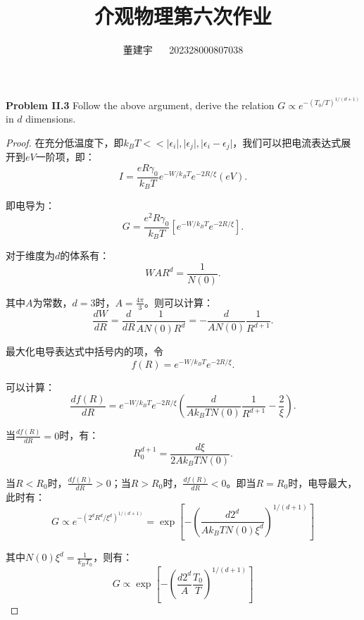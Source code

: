 \documentclass[reqno,a4paper,12pt]{amsart}
\title{介观物理第六次作业}
\author{董建宇 ~~ 202328000807038}
\begin{document}
\maketitle
\titleformat{\section}[hang]{\small}{\thesection}{0.8em}{}{}
\titleformat{\subsection}[hang]{\small}{\thesubsection}{0.8em}{}{}


\textbf{Problem II.3} Follow the above argument, derive the relation $G \propto e^{-(T_0/T)^{1/(d+1)}}$ in $d$ dimensions.

\begin{proof}

在充分低温度下，即$k_BT << \vert \epsilon_i \vert, \vert \epsilon_j \vert, \vert \epsilon_i - \epsilon_j \vert$，我们可以把电流表达式展开到$eV$一阶项，即：
\[
	I = \frac{eR\gamma_0}{k_BT} e^{-W/k_BT} e^{-2R/\xi} (eV).
\]

即电导为：
\[
	G = \frac{e^2R\gamma_0}{k_BT} \left[ e^{-W/k_BT} e^{-2R/\xi} \right].
\]

对于维度为$d$的体系有：
\[
	WAR^d = \frac{1}{N(0)}.
\]

其中$A$为常数，$d=3$时，$A = \frac{4\pi}{3}$。则可以计算：
\[
	\frac{dW}{dR} = \frac{d}{dR} \frac{1}{AN(0)R^d} = -\frac{d}{AN(0)}\frac{1}{R^{d+1}}.
\]

最大化电导表达式中括号内的项，令
\[
	f(R) = e^{-W/k_BT} e^{-2R/\xi}.
\]

可以计算：
\[
	\frac{df(R)}{dR} = e^{-W/k_BT} e^{-2R/\xi} \left( \frac{d}{Ak_BTN(0)} \frac{1}{R^{d+1}} - \frac{2}{\xi} \right).
\]

当$\frac{df(R)}{dR} = 0$时，有：
\[
	R_0^{d+1} = \frac{d\xi}{2Ak_BTN(0)}.
\]

当$R< R_0$时，$\frac{df(R)}{dR}>0$；当$R>R_0$时，$\frac{df(R)}{dR}<0$。即当$R = R_0$时，电导最大，此时有：
\[
	G \propto e^{-(2^dR^d/\xi^d)^{1/(d+1)}} = \exp \left[ -\left( \frac{d2^d}{Ak_BT N(0)\xi^d} \right)^{1/(d+1)} \right]
\]

其中$N(0)\xi^d = \frac{1}{k_BT_0}$，则有：
\[
	G \propto \exp \left[ -\left( \frac{d2^d}{A} \frac{T_0}{T} \right)^{1/(d+1)} \right]
\]

\end{proof}
\end{document}

